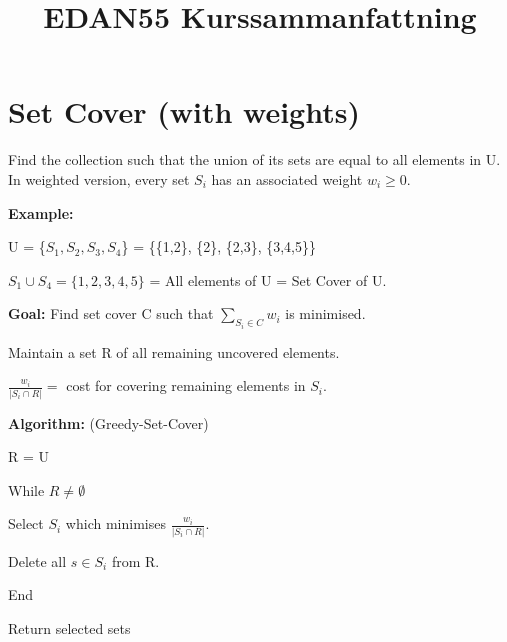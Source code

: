 \documentclass{proc}
\title{\sf EDAN55 Kurssammanfattning}
\begin{document}
\maketitle

\tableofcontents

\section{Set Cover (with weights)}

Find the collection such that the union of its sets are equal to all elements in U. In weighted version, every set $S_{i}$ has an associated weight $w_{i} \ge 0$.

\begin{mdframed}
    \textbf{Example:}
    
    U = \{$S_{1}, S_{2}, S_{3}, S_{4}$\} = \{\{1,2\}, \{2\}, \{2,3\}, \{3,4,5\}\}
    
    $S_{1} \cup S_{4} = \{1,2,3,4,5\}$ = All elements of U = Set Cover of U.
\end{mdframed}

\textbf{Goal:} Find set cover C such that $\sum_{S_{i} \in C} w_{i}$ is minimised.

Maintain a set R of all remaining uncovered elements.
\begin{mdframed}
    $\frac{w_{i}}{|S_{i} \cap R|} = $ cost for covering remaining elements in $S_{i}$.
\end{mdframed}

\begin{mdframed}
    \textbf{Algorithm:} (Greedy-Set-Cover)
    
    R = U
    
    While $R \neq \emptyset$
    
        \hspace{2ex} Select $S_{i}$ which minimises $\frac{w_{i}}{|S_{i} \cap R|}$.
        
        \hspace{2ex} Delete all $s \in S_{i}$ from R.
        
    End
    
    Return selected sets
\end{mdframed}
\end{document}
